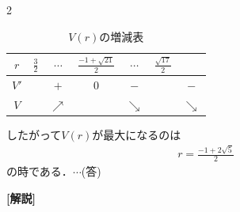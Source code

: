 \documentclass[../../../../main.tex]{subfiles}
\begin{document}
\begin{multicols}{2}
  \begin{table}[H]
    \centering
    \caption{$V(r)$の増減表}
    \label{1993-3:table:1}
    \begin{tabular}{|c||c|c|c|c|c|c|}
      \hline
      $r$  & $\frac{3}{2}$ & $\cdots$   & $\frac{-1+\sqrt{21}}{2}$ & $\cdots$   & $\frac{\sqrt{17}}{2}$ &            \\
      \hline
      $V'$ &               & $+$        & $0$                      & $-$        &                       & $-$        \\
      \hline
      $V$  &               & $\nearrow$ &                          & $\searrow$ &                       & $\searrow$ \\
      \hline
    \end{tabular}
  \end{table}

  したがって$V(r)$が最大になるのは
  \begin{align*}
    r=\frac{-1+2\sqrt{5}}{2}
  \end{align*}
  の時である．$\cdots$(答)

  \vspace{10pt}

  {\bf[解説]}



  \newpage
\end{multicols}
\end{document}
